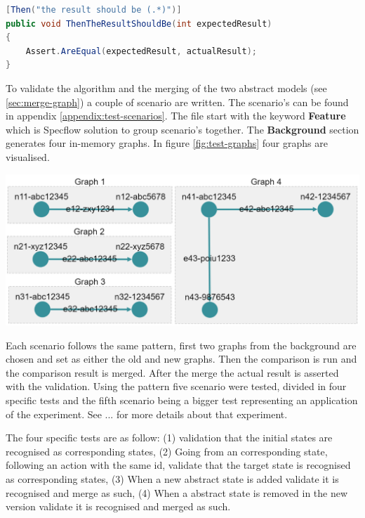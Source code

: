 \begin{lstlisting}[language=Java, caption=Implementation of a 'then' line, label=code:gherkin-example-code]
[Then("the result should be (.*)")]
public void ThenTheResultShouldBe(int expectedResult)
{
    Assert.AreEqual(expectedResult, actualResult);
}
\end{lstlisting}

To validate the algorithm and the merging of the two abstract models (see \ref{sec:merge-graph}) a couple of scenario are written. The scenario's can be found in appendix \ref{appendix:test-scenarios}. The file start with the keyword \textbf{Feature} which is Specflow solution to group scenario's together. The \textbf{Background} section generates four in-memory graphs. In figure \ref{fig:test-graphs} four graphs are visualised. 

\newpage
\begingroup
\captionsetup{type=figure}
\includegraphics[scale=0.6]{images/6-TestGraphs.png}
\label{fig:test-graphs}
\endgroup

Each scenario follows the same pattern, first two graphs from the background are chosen and set as either the old and new graphs. Then the comparison is run and the comparison result is merged. After the merge the actual result is asserted with the validation. Using the pattern five scenario were tested, divided in four specific tests and the fifth scenario being a bigger test representing an application of the experiment. See ... for more details about that experiment. 


The four specific tests are as follow: (1) validation that the initial states are recognised as corresponding states, (2) Going from an corresponding state, following an action with the same id, validate that the target state is recognised as corresponding states, (3) When a new abstract state is added validate it is recognised and merge as such, (4) When a abstract state is removed in the new version validate it is recognised and merged as such.

